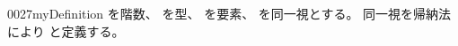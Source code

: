 \documentclass[index]{subfiles}
\begin{document}
\begin{myBlock}{0027}{myDefinition}
  を階数、
  を型、
  を要素、
  を同一視とする。
  同一視を帰納法により
  と定義する。
\end{myBlock}
\end{document}
